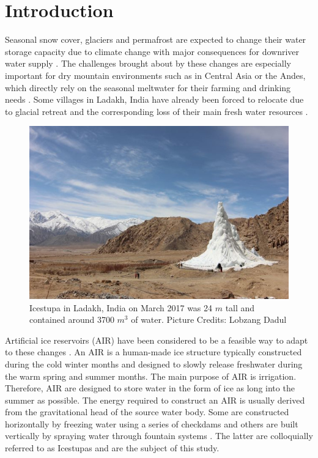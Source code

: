 \documentclass[utf8]{frontiersSCNS} %
\begin{document}
\section{Introduction}

Seasonal snow cover, glaciers and permafrost are expected to change their water storage capacity due to climate change
with major consequences for downriver water supply \citep{Immerzeel_2020}. The challenges brought about by these changes
are especially important for dry mountain environments such as in Central Asia or the Andes, which directly rely on the
seasonal meltwater for their farming and drinking needs \citep{HoelzleBarandun_2019, Apel_2018, Buytaert_2017,
	Chen_2016, UNGERSHAYESTEH_2013}. Some villages in Ladakh, India have already been forced to relocate due to glacial
retreat and the corresponding loss of their main fresh water resources \citep{zanskar}.

\begin{figure} \begin{center} \includegraphics[width=10 cm]{Figures/Figure_1.jpg}
	\end{center} \caption{Icestupa in Ladakh, India on March 2017 was 24 $m$ tall and contained around 3700 $m^3$
		of water. Picture Credits: Lobzang Dadul} \label{fig:cone} \end{figure}

Artificial ice reservoirs (AIR) have been considered to be a feasible way to adapt to these changes \citep{IPCC_2019,
	10.1659/MRD-JOURNAL-D-18-00072.1}. An AIR is a human-made ice structure typically constructed during the cold winter
months and designed to slowly release freshwater during the warm spring and summer months. The main purpose of
AIR is irrigation. Therefore, AIR are designed to store water in the form of ice as long into the summer as possible.
The energy required to construct an AIR is usually derived from the gravitational head of the source water body. Some
are constructed horizontally by freezing water using a series of checkdams and others are built vertically by spraying
water through fountain systems \citep{Nusser_2018}. The latter are colloquially referred to as Icestupas and are the
subject of this study.
\end{document}
